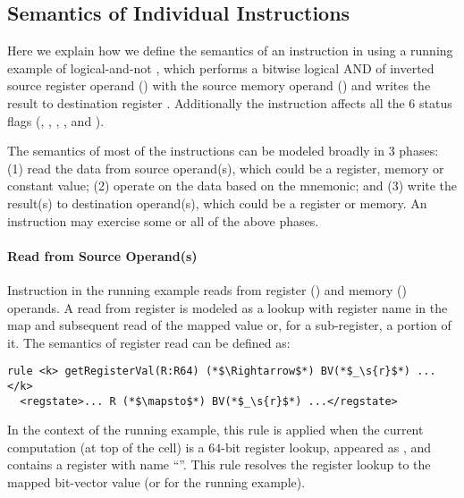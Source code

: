 \subsection{Semantics of Individual Instructions}
\label{sec:semantics-of-individual-instructions}

Here we explain how we define the semantics of an instruction in \K using a running example of logical-and-not , which performs a bitwise logical AND of inverted source register operand () with the source memory operand () and writes the result to destination register . Additionally the instruction affects all the $6$ status flags (, , , ,  and ).


%

The semantics of most of the instructions can be modeled broadly in $3$ phases: (1) read the data from source operand(s), which could be a register, memory or constant value; (2) operate on the data based on the mnemonic; and (3) write the result(s) to destination operand(s), which could be a register or memory. An instruction may exercise some or all of the above phases. 
   
\vspace{-2pt}
\paragraph{Read from Source Operand(s)}

Instruction in the running example reads from  register () and memory () operands. A read from register is modeled as a lookup with register name in the  map and subsequent read of the mapped value or,
for a sub-register, a portion of it. The semantics of register read can be defined as:  
\begin{lstlisting}[style=KRULE]
rule <k> getRegisterVal(R:R64) (*$\Rightarrow$*) BV(*$_\s{r}$*) ...</k>
  <regstate>... R (*$\mapsto$*) BV(*$_\s{r}$*) ...</regstate>
\end{lstlisting}
 In the context of the running example, this rule
is applied when the current computation (at top of the  cell) is a $64$-bit register
lookup, appeared as  , and  contains a register
with name ``''. This rule resolves the register lookup  to the mapped bit-vector value  (or  for the running example). 

